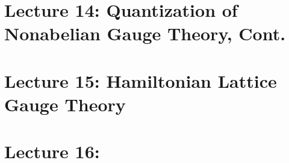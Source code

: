 \documentclass[10pt]{article}
\begin{document}


\clearpage

\section*{Lecture 14: Quantization of Nonabelian Gauge Theory, Cont.}
\label{sec: lec14}



\clearpage

\section*{Lecture 15: Hamiltonian Lattice Gauge Theory}
\label{sec: lec15}



\clearpage

\section*{Lecture 16: }
\label{sec: lec16}

%

\end{document}
